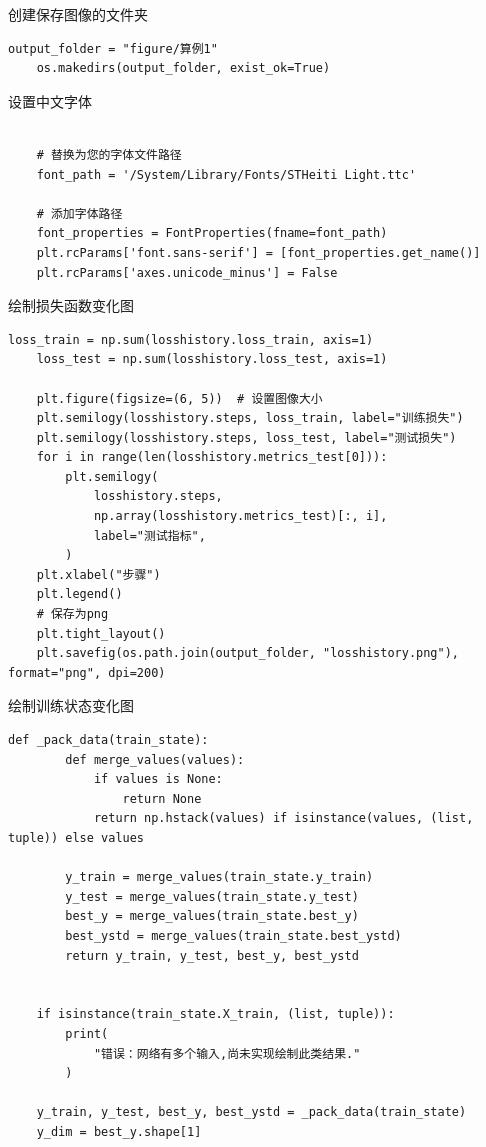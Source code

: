 \documentclass{Sichuan Normal University}
\begin{document}
\noindent 创建保存图像的文件夹
\begin{lstlisting}[style=python,basicstyle=\footnotesize\fontspec{Courier New},]  
    output_folder = "figure/算例1"
    os.makedirs(output_folder, exist_ok=True)
\end{lstlisting}
设置中文字体
\begin{lstlisting}[style=python,basicstyle=\footnotesize\fontspec{Courier New},]  
    
    # 替换为您的字体文件路径
    font_path = '/System/Library/Fonts/STHeiti Light.ttc'
    
    # 添加字体路径
    font_properties = FontProperties(fname=font_path)
    plt.rcParams['font.sans-serif'] = [font_properties.get_name()]
    plt.rcParams['axes.unicode_minus'] = False
\end{lstlisting}  
绘制损失函数变化图
\begin{lstlisting}[style=python,basicstyle=\footnotesize\fontspec{Courier New},]  
    loss_train = np.sum(losshistory.loss_train, axis=1)
    loss_test = np.sum(losshistory.loss_test, axis=1)
    
    plt.figure(figsize=(6, 5))  # 设置图像大小
    plt.semilogy(losshistory.steps, loss_train, label="训练损失")
    plt.semilogy(losshistory.steps, loss_test, label="测试损失")
    for i in range(len(losshistory.metrics_test[0])):
        plt.semilogy(
            losshistory.steps,
            np.array(losshistory.metrics_test)[:, i],
            label="测试指标",
        )
    plt.xlabel("步骤")
    plt.legend()
    # 保存为png
    plt.tight_layout()
    plt.savefig(os.path.join(output_folder, "losshistory.png"), format="png", dpi=200)
\end{lstlisting}  
绘制训练状态变化图
\begin{lstlisting}[style=python,basicstyle=\footnotesize\fontspec{Courier New},]     
    def _pack_data(train_state):
        def merge_values(values):
            if values is None:
                return None
            return np.hstack(values) if isinstance(values, (list, tuple)) else values
    
        y_train = merge_values(train_state.y_train)
        y_test = merge_values(train_state.y_test)
        best_y = merge_values(train_state.best_y)
        best_ystd = merge_values(train_state.best_ystd)
        return y_train, y_test, best_y, best_ystd
    
    
    if isinstance(train_state.X_train, (list, tuple)):
        print(
            "错误：网络有多个输入,尚未实现绘制此类结果."
        )
    
    y_train, y_test, best_y, best_ystd = _pack_data(train_state)
    y_dim = best_y.shape[1]
\end{lstlisting}  
\end{document}
